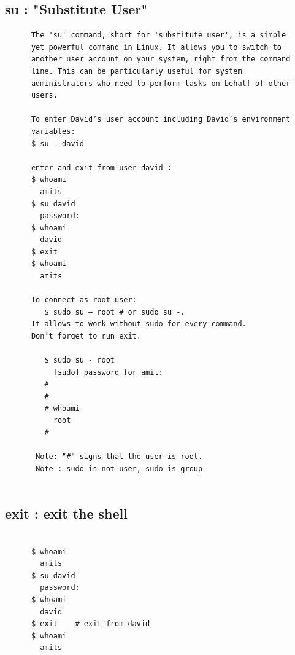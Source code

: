 \documentclass[a4paper,12pt]{article}
\begin{document}
\subsection{su   : "Substitute User"}
\begin{verbatim}
      The 'su' command, short for 'substitute user', is a simple 
      yet powerful command in Linux. It allows you to switch to 
      another user account on your system, right from the command 
      line. This can be particularly useful for system 
      administrators who need to perform tasks on behalf of other 
      users.
      
      To enter David’s user account including David’s environment
      variables:
﻿      $ su - david

      enter and exit from user david :
      $ whoami
        amits
      $ su david
        password:
      $ whoami
        david 
      $ exit
      $ whoami
        amits 
        
      To connect as root user: 
         $ sudo su – root # or sudo su -.
      It allows to work without sudo for every command. 
      Don’t forget to run exit.  
      
         $ sudo su - root
           [sudo] password for amit:       
         # 
         #
         # whoami
           root
         # 

       Note: "#" signs that the user is root.
       Note : sudo is not user, sudo is group
          
\end{verbatim}

\subsection{exit   : exit the shell}
\begin{verbatim}

      $ whoami
        amits
      $ su david
        password:
      $ whoami
        david 
      $ exit    # exit from david
      $ whoami
        amits   
\end{verbatim}
\end{document}
